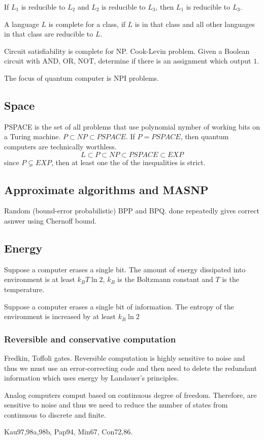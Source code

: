 \begin{proposition}
    If \(L_1\) is reducible to \(L_2\) and \(L_2\) is reducible to \(L_3\), then \(L_1\) is reducible to \(L_3\).
\end{proposition}

A language \(L\) is complete for a class, if \(L\) is in that class and all other languages in that class are reducible to \(L\).
\begin{example}
    Circuit satisfiability is complete for NP. Cook-Levin problem. Given a Boolean circuit with AND, OR, NOT, determine if there is an assignment which output \(1\).
\end{example}

The focus of quantum computer is NPI problems.
\subsection{Space}
PSPACE is the set of all problems that use polynomial nymber of working bits on a Turing machine. \(P \subset NP \subset PSPACE\). If \(P = PSPACE\), then quantum computers are technically worthless. 
\begin{equation*}
    L \subset P \subset NP \subset PSPACE \subset EXP
\end{equation*}
since \(P \subsetneq EXP\), then at least one the of the inequalities is strict. 
\subsection{Approximate algorithms and MASNP}
Random (bound-error probabilistic) BPP and BPQ. done repeatedly gives correct asnwer using Chernoff bound.
\subsection{Energy}
\begin{theorem} Suppose a computer erases a single bit. The amount of energy dissipated into environment is at least \(k_B T \ln 2\), \(k_B\) is the Boltzmann constant and \(T\) is the temperature.
\end{theorem}

\begin{theorem} Suppose a computer erases a single bit of information. The entropy of the environment is increased by at least \(k_B \ln 2\)
\end{theorem}
\subsubsection{Reversible and conservative computation}
Fredkin, Toffoli gates.
Reversible computation is highly sensitive to noise and thus we must use an error-correcting code and then need to delete the redundant information which uses energy by Landauer's principles.

Analog computers comput based on continuous degree of freedom. Therefore, are sensitive to noise and thus we need to reduce the number of states from continuous to discrete and finite.

Kau97,98a,98b, Pap94, Min67, Con72,86.